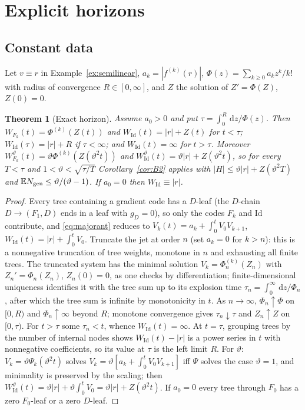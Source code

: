 \documentclass[11pt]{article}
\newtheorem{theorem}{Theorem}[section]
\theoremstyle{definition}
\theoremstyle{remark}
\newcommand{\E}{\mathbb{E}}
\newcommand{\Id}{\mathrm{Id}}
\newcommand{\dd}{\,\mathrm{d}}
\begin{document}
\section{Explicit horizons}\label{sec:explicit}

\subsection{Constant data}

Let $v\equiv r$ in Example~\ref{ex:semilinear}, $a_k=|f^{(k)}(r)|$,
$\Phi(z)=\sum_{k\ge0}a_kz^k/k!$ with radius of convergence
$R\in[0,\infty]$, and $Z$ the solution of $Z'=\Phi(Z)$, $Z(0)=0$.

\begin{theorem}[Exact horizon]\label{thm:C}
Assume $a_0>0$ and put $\tau=\int_0^R\dd z/\Phi(z)$. Then
$W_{F_k}(t)=\Phi^{(k)}(Z(t))$ and $W_\Id(t)=|r|+Z(t)$ for $t<\tau$;
$W_\Id(\tau)=|r|+R$ if $\tau<\infty$; and $W_\Id(t)=\infty$ for $t>\tau$.
Moreover $W^\vartheta_{F_k}(t)=\vartheta\Phi^{(k)}(Z(\vartheta^2t))$ and
$W^\vartheta_\Id(t)=\vartheta|r|+Z(\vartheta^2t)$, so for every $T<\tau$
and $1<\vartheta<\sqrt{\tau/T}$ Corollary~\ref{cor:B2} applies with
$|H|\le\vartheta|r|+Z(\vartheta^2T)$ and $\E N_{\rm gen}\le\vartheta/(\vartheta-1)$.
If $a_0=0$ then $W_\Id\equiv|r|$.
\end{theorem}

\begin{proof}
Every tree containing a gradient code has a $D$-leaf (the $D$-chain
$D\to(F_1,D)$ ends in a leaf with $g_D=0$), so only the codes $F_k$ and
$\Id$ contribute, and \eqref{eq:majorant} reduces to $V_k(t)=a_k+\int_0^t
V_0V_{k+1}$, $W_\Id(t)=|r|+\int_0^tV_0$. Truncate the jet at order $n$
(set $a_k=0$ for $k>n$): this is a nonnegative truncation of tree weights,
monotone in $n$ and exhausting all finite trees. The truncated system has
the minimal solution $V_k=\Phi_n^{(k)}(Z_n)$ with $Z_n'=\Phi_n(Z_n)$,
$Z_n(0)=0$, as one checks by differentiation; finite-dimensional
uniqueness identifies it with the tree sum up to its explosion time
$\tau_n=\int_0^\infty\dd z/\Phi_n$, after which the tree sum is infinite
by monotonicity in $t$. As $n\to\infty$, $\Phi_n\uparrow\Phi$ on $[0,R)$
and $\Phi_n\uparrow\infty$ beyond $R$; monotone convergence gives
$\tau_n\downarrow\tau$ and $Z_n\uparrow Z$ on $[0,\tau)$. For $t>\tau$ some
$\tau_n<t$, whence $W_\Id(t)=\infty$. At $t=\tau$, grouping trees by the
number of internal nodes shows $W_\Id(t)-|r|$ is a power series in $t$
with nonnegative coefficients, so its value at $\tau$ is the left limit
$R$. For $\vartheta$: $V_k=\vartheta\Psi_k(\vartheta^2t)$ solves
$V_k=\vartheta[a_k+\int_0^tV_0V_{k+1}]$ iff $\Psi$ solves the case
$\vartheta=1$, and minimality is preserved by the scaling; then
$W^\vartheta_\Id(t)=\vartheta|r|+\vartheta\int_0^tV_0=\vartheta|r|+Z(\vartheta^2t)$.
If $a_0=0$ every tree through $F_0$ has a zero $F_0$-leaf or a zero
$D$-leaf.
\end{proof}
\end{document}
